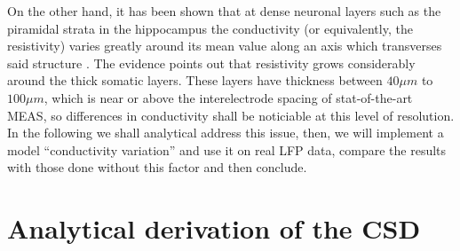 \documentclass{article}
\begin{document}
On the other hand, it has been shown that at 
dense neuronal layers such as the piramidal
strata in the hippocampus the conductivity (or equivalently,
the resistivity) varies greatly around its mean value along
an axis which transverses said structure
\cite{Holsheimer87, Lopez01, TrevinoPersonal}. 
The evidence points out that resistivity grows 
considerably around the thick somatic layers. These layers 
have thickness between $40\mu m$ to $100 \mu m$, which is
near or above the interelectrode spacing of stat-of-the-art MEAS, so
differences in conductivity shall be noticiable at this
level of resolution. In the following we shall analytical address this
issue, then, we will implement a model ``conductivity variation'' 
and use it on real LFP data, compare
the results with those done without this factor and then conclude.


\section{Analytical  derivation of the CSD}
\end{document}
